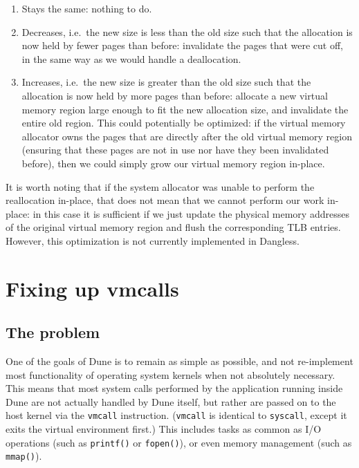 \begin{enumerate}
	\item Stays the same: nothing to do.
	\item Decreases, i.e.\ the new size is less than the old size such that the allocation is now held by fewer pages than before: invalidate the pages that were cut off, in the same way as we would handle a deallocation.
	\item Increases, i.e.\ the new size is greater than the old size such that the allocation is now held by more pages than before: allocate a new virtual memory region large enough to fit the new allocation size, and invalidate the entire old region. This could potentially be optimized: if the virtual memory allocator owns the pages that are directly after the old virtual memory region (ensuring that these pages are not in use nor have they been invalidated before), then we could simply grow our virtual memory region in-place.
\end{enumerate}

It is worth noting that if the system allocator was unable to perform the reallocation in-place, that does not mean that we cannot perform our work in-place: in this case it is sufficient if we just update the physical memory addresses of the original virtual memory region and flush the corresponding TLB entries. However, this optimization is not currently implemented in Dangless.

\section{Fixing up vmcalls}
\label{sec:vmcall-pointer-rewriting}

\subsection{The problem}

One of the goals of Dune is to remain as simple as possible, and not re-implement most functionality of operating system kernels when not absolutely necessary. This means that most system calls performed by the application running inside Dune are not actually handled by Dune itself, but rather are passed on to the host kernel via the \lstinline!vmcall! instruction. (\lstinline!vmcall! is identical to \lstinline!syscall!, except it exits the virtual environment first.) This includes tasks as common as I/O operations (such as \lstinline!printf()! or \lstinline!fopen()!), or even memory management (such as \lstinline!mmap()!).

